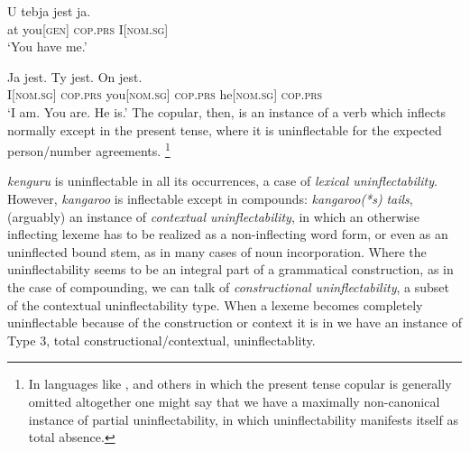 \documentclass[output=paper,colorlinks,citecolor=brown]{langscibook}
\begin{document}
\ea\label{jestja}
\gll	U	tebja				jest\pr{}		ja.\\
at	you[\textsc{gen}]	\textsc{cop.prs}	I[\textsc{nom.sg}]\\
\glt	`You have me.' 									
\z

\ea\label{tokareva}
\gll	Ja				jest\pr.		Ty				jest\pr.		On 				jest\pr.				\\
I[\textsc{nom.sg}] 	\textsc{cop.prs}	you[\textsc{nom.sg}]	\textsc{cop.prs}	he[\textsc{nom.sg}]	\textsc{cop.prs}			\\
\glt	`I am. You are. He is.'													
\z
The  copular, then, is an instance of a verb which inflects normally except in  the present tense, where it  is uninflectable for the expected person/number agreements.%
\footnote{%
	In languages like ,  and others in which the present tense copular is generally omitted altogether one might say that we have a maximally non-canonical instance of partial uninflectability, in which uninflectability manifests itself as total absence. 
}

	 \textit{kenguru} is uninflectable in all its occurrences, a case of  \textit{lexical uninflectability}. However,  \textit{kangaroo} is inflectable except in compounds: \textit{kangaroo(*s)} \textit{tails},  (arguably) an instance of \textit{contextual uninflectability}, in which an otherwise inflecting lexeme has to be realized as a non-inflecting word form, or even as an uninflected bound stem, as in many cases of noun incorporation. Where the uninflectability seems to be an integral part of a grammatical construction, as in the case of  compounding, we can talk of \textit{constructional uninflectability}, a subset of the contextual uninflectability type. When a lexeme becomes completely uninflectable because of the construction or context it is in we have an instance of Type 3, total constructional/contextual, uninflectablity.
\end{document}
